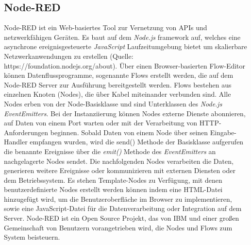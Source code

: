 \documentclass[BMR,Bachelor,ngerman]{twbook}%
\begin{document}
\subsection{Node-RED}
Node-RED ist ein Web-basiertes Tool zur Vernetzung von \acp{API} und netzwerkfähigen Geräten. Es baut auf dem \emph{Node.js} framework auf, welches eine asynchrone ereignisgesteuerte \emph{JavaScript} Laufzeitumgebung bietet um skalierbare Netzwerkanwendungen zu erstellen {\color{red}(Quelle: https://foundation.nodejs.org/about)}. Über einen Browser-basierten Flow-Editor können Datenflussprogramme, sogenannte Flows erstellt werden, die auf dem Node-RED Server zur Ausführung bereitgestellt werden. Flows bestehen aus einzelnen Knoten (Nodes), die über Kabel miteinander verbunden sind. Alle Nodes erben von der Node-Basisklasse und sind Unterklassen des \emph{Node.js} \emph{EventEmitters}. Bei der Instanziierung können Nodes externe Dienste abonnieren, auf Daten von einem Port warten oder mit der Verarbeitung von \ac{HTTP}-Anforderungen beginnen. Sobald Daten von einem Node über seinen Eingabe-Handler empfangen wurden, wird die send() Methode der Basisklasse aufgerufen die benannte Ereignisse über die \emph{emit()} Methode des \emph{EventEmitters} an nachgelagerte Nodes sendet. Die nachfolgenden Nodes verarbeiten die Daten, generieren weitere Ereignisse oder kommunizieren mit externen Diensten oder dem Betriebssystem. Es stehen Template-Nodes zu Verfügung, mit denen benutzerdefinierte Nodes erstellt werden können indem eine HTML-Datei hinzugefügt wird, um die Benutzeroberfläche im Browser zu implementieren, sowie eine JavaScript-Datei für die Datenverarbeitung oder Integration auf dem Server. Node-RED ist ein Open Source Projekt, das von IBM und einer großen Gemeinschaft von Benutzern vorangetrieben wird, die Nodes und Flows zum System beisteuern. \cite{giang2014toward}
\end{document}
